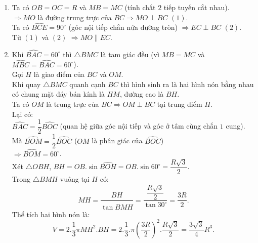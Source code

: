 \begin{ex}
{\begin{enumerate}
\begin{center}
\end{center}
\item Ta có $OB=OC=R$ và $MB=MC$ (tính chất $2$ tiếp tuyến cắt nhau).\\
$\Rightarrow MO$ là đường trung trực của $BC \Rightarrow MO \perp BC$ $(1)$.\\
Ta có $\widehat{BCE}=90^{\circ}$ (góc nội tiếp chắn nửa đường tròn) $\Rightarrow EC \perp BC$ $(2)$.\\
Từ $(1)$ và $(2)$ $\Rightarrow MO \parallel EC$.
\item Khi $\widehat{BAC}=60^{\circ}$ thì $\triangle BMC$ là tam giác đều (vì $MB=MC$ và $\widehat{MBC}=\widehat{BAC}=60^{\circ}$).\\
Gọi $H$ là giao điểm của $BC$ và $OM$.\\
Khi quay $\triangle BMC$ quanh cạnh $BC$ thì hình sinh ra là hai hình nón bằng nhau có chung mặt đáy bán kính là $HM$, đường cao là $BH$.\\
Ta có $OM$ là trung trực của $BC \Rightarrow OM \perp BC$ tại trung điểm $H$.\\
Lại có:\\
$\widehat{BAC}=\dfrac{1}{2}\widehat{BOC}$ (quan hệ giữa góc nội tiếp và góc ở tâm cùng chắn $1$ cung).\\
Mà $\widehat{BOM}=\dfrac{1}{2}\widehat{BOC}$ ($OM$ là phân giác của $\widehat{BOC}$)\\
$\Rightarrow \widehat{BOM}=60^{\circ}$.\\
Xét $\triangle OBH$, $BH=OB.\sin{\widehat{BOH}}=OB.\sin{60^{\circ}}=\dfrac{R\sqrt{3}}{2}$.\\
Trong $\triangle BMH$ vuông tại $H$ có:\\
$$MH=\dfrac{BH}{\tan{\widehat{BMH}}}=\dfrac{\dfrac{R\sqrt{3}}{2}}{\tan{30^{\circ}}}=\dfrac{3R}{2}.$$
Thể tích hai hình nón là:
$$V=2.\dfrac{1}{3}\pi MH^2. BH=2.\dfrac{1}{3}.\pi\left(\dfrac{3R}{2}\right)^2.\dfrac{R\sqrt{3}}{2}=\dfrac{3\sqrt{3}}{4}R^3.$$
\end{enumerate}
}
\end{ex}
